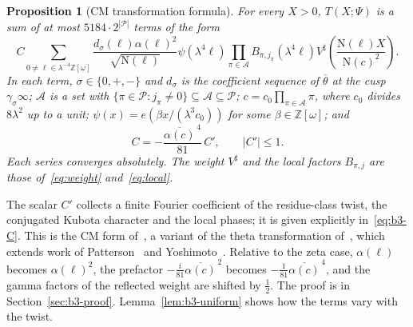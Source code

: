 \documentclass[11pt]{article}
\numberwithin{equation}{section}
\newcommand{\OO}{\mathbb Z[\omega]}
\newcommand{\N}{\mathrm N}
\newtheorem{proposition}{Proposition}
\begin{document}
\begin{proposition}[CM transformation formula]\label{prop:b3-reflection}
For every $X>0$, $T(X;\Psi)$ is a sum of at most
$5184\cdot2^{|\mathcal P|}$ terms of the form
\begin{equation}\label{eq:reflection}
 C\sum_{0\ne\ell\in\lambda^{-4}\OO}
 \frac{d_\sigma(\ell)\alpha(\ell)^2}{\sqrt{\N(\ell)}}
 \psi(\lambda^4\ell)\prod_{\pi\in\mathcal A}B_{\pi,j_\pi}(\lambda^4\ell)
 V^\sharp\left(\frac{\N(\ell)X}{\N(c)^2}\right).
\end{equation}
In each term, $\sigma\in\{0,+,-\}$ and $d_\sigma$ is the coefficient
sequence of $\overline\theta$ at the cusp $\gamma_\sigma\infty$;
$\mathcal A$ is a set with
$\{\pi\in\mathcal P:j_\pi\ne0\}\subseteq\mathcal A\subseteq\mathcal P$;
$c=c_0\prod_{\pi\in\mathcal A}\pi$, where $c_0$ divides $8\lambda^2$ up to
a unit; $\psi(x)=e(\beta x/(\lambda^3c_0))$ for some $\beta\in\OO$; and
\begin{equation}\label{eq:d097}
 C=-\frac{\overline{\alpha(c)}^{\,4}}{81}\,C',\qquad|C'|\le1.
\end{equation}
Each series converges absolutely. The weight $V^\sharp$ and the local
factors $B_{\pi,j}$ are those of~\eqref{eq:weight} and~\eqref{eq:local}.
\end{proposition}

The scalar $C'$ collects a finite Fourier coefficient of the
residue-class twist, the conjugated Kubota character and the local
phases; it is given explicitly in~\eqref{eq:b3-C}. This is the CM form
of~\cite[Proposition~6.2]{OAI1112}, a variant of the theta transformation of~\cite[Section~5]{DR}, which extends work of Patterson~\cite{Pat77} and Yoshimoto~\cite{Yos87}. Relative to the zeta case, $\alpha(\ell)$
becomes $\alpha(\ell)^2$, the prefactor
$-\frac i{81}\overline{\alpha(c)}^{\,2}$ becomes
$-\frac1{81}\overline{\alpha(c)}^{\,4}$, and the gamma factors of the
reflected weight are shifted by $\frac12$. The proof is in
Section~\ref{sec:b3-proof}. Lemma~\ref{lem:b3-uniform} shows how the
terms vary with the twist.
\end{document}
